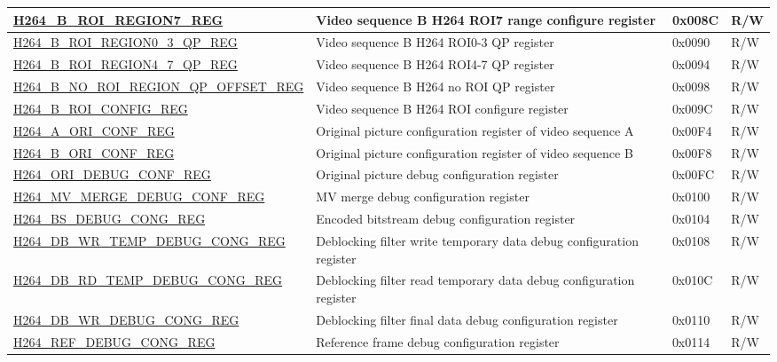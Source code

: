 \begin{longtable}{ | p{7cm} | p{6.2cm} | p{1.2cm} | p{1cm} | }
\hyperref[regdesc:H264BROIREGION7REG]{H264\_B\_ROI\_REGION7\_REG} & Video sequence B H264 ROI7 range configure register & 0x008C & R/W \\ \hline
\hyperref[regdesc:H264BROIREGION03QPREG]{H264\_B\_ROI\_REGION0\_3\_QP\_REG} & Video sequence B H264 ROI0-3 QP register & 0x0090 & R/W \\ \hline
\hyperref[regdesc:H264BROIREGION47QPREG]{H264\_B\_ROI\_REGION4\_7\_QP\_REG} & Video sequence B H264 ROI4-7 QP register & 0x0094 & R/W \\ \hline
\hyperref[regdesc:H264BNOROIREGIONQPOFFSETREG]{H264\_B\_NO\_ROI\_REGION\_QP\_OFFSET\_REG} & Video sequence B H264 no ROI QP register & 0x0098 & R/W \\ \hline
\hyperref[regdesc:H264BROICONFIGREG]{H264\_B\_ROI\_CONFIG\_REG} & Video sequence B H264 ROI configure register & 0x009C & R/W \\ \hline
\hyperref[regdesc:H264AORICONFREG]{H264\_A\_ORI\_CONF\_REG} & Original picture configuration register of video sequence A & 0x00F4 & R/W \\ \hline
\hyperref[regdesc:H264BORICONFREG]{H264\_B\_ORI\_CONF\_REG} & Original picture configuration register of video sequence B & 0x00F8 & R/W \\ \hline
\hyperref[regdesc:H264ORIDEBUGCONFREG]{H264\_ORI\_DEBUG\_CONF\_REG} & Original picture debug configuration register & 0x00FC & R/W \\ \hline
\hyperref[regdesc:H264MVMERGEDEBUGCONFREG]{H264\_MV\_MERGE\_DEBUG\_CONF\_REG} & MV merge debug configuration register & 0x0100 & R/W \\ \hline
\hyperref[regdesc:H264BSDEBUGCONGREG]{H264\_BS\_DEBUG\_CONG\_REG} & Encoded bitstream debug configuration register & 0x0104 & R/W \\ \hline
\hyperref[regdesc:H264DBWRTEMPDEBUGCONGREG]{H264\_DB\_WR\_TEMP\_DEBUG\_CONG\_REG} & Deblocking filter write temporary data debug configuration register & 0x0108 & R/W \\ \hline
\hyperref[regdesc:H264DBRDTEMPDEBUGCONGREG]{H264\_DB\_RD\_TEMP\_DEBUG\_CONG\_REG} & Deblocking filter read temporary data debug configuration register & 0x010C & R/W \\ \hline
\hyperref[regdesc:H264DBWRDEBUGCONGREG]{H264\_DB\_WR\_DEBUG\_CONG\_REG} & Deblocking filter final data debug configuration register & 0x0110 & R/W \\ \hline
\hyperref[regdesc:H264REFDEBUGCONGREG]{H264\_REF\_DEBUG\_CONG\_REG} & Reference frame debug configuration register & 0x0114 & R/W \\ \hline


\end{longtable}
